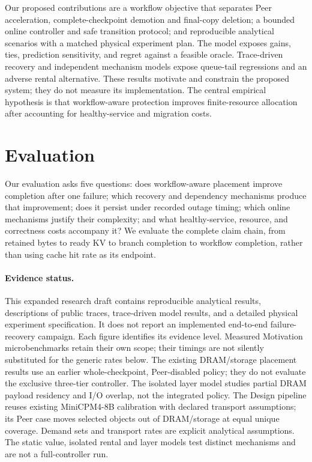 \documentclass[sigplan,10pt,anonymous,nonacm]{acmart}
\begin{document}
Our proposed contributions are a workflow objective that separates Peer
acceleration, complete-checkpoint demotion and final-copy deletion; a bounded online controller and safe transition
protocol; and reproducible analytical scenarios with a matched physical
experiment plan. The model exposes gains, ties, prediction sensitivity,
and regret against a feasible oracle. Trace-driven recovery and independent
mechanism models expose queue-tail regressions and an adverse rental
alternative. These results
motivate and constrain the proposed
system; they do not measure its implementation. The central empirical
hypothesis is that workflow-aware protection improves finite-resource
allocation after accounting for healthy-service and migration costs.





\section{Evaluation}
\label{sec:evaluation}

Our evaluation asks five questions: does workflow-aware placement improve
completion after one failure; which recovery and dependency mechanisms
produce that improvement; does it persist under recorded outage timing;
which online mechanisms justify their complexity; and what healthy-service,
resource, and correctness costs accompany it? We evaluate the complete
claim chain, from retained bytes to ready KV to branch completion to
workflow completion, rather than using cache hit rate as its endpoint.

\paragraph{Evidence status.}
This expanded research draft contains reproducible analytical results,
descriptions of public traces, trace-driven model results, and a detailed
physical experiment specification. It does not report an implemented
end-to-end failure-recovery campaign. Each figure identifies its evidence
level. Measured Motivation microbenchmarks retain their own scope;
their timings are not silently substituted for the generic rates below.
The existing DRAM/storage placement results use an earlier whole-checkpoint,
Peer-disabled policy; they do not evaluate the exclusive three-tier
controller. The isolated layer model studies partial DRAM payload
residency and I/O overlap, not the integrated policy. The Design pipeline
reuses existing MiniCPM4-8B calibration with declared transport assumptions;
its Peer case moves selected objects out of DRAM/storage at equal unique
coverage. Demand sets and transport rates are explicit analytical assumptions.
The static value, isolated rental and layer models test distinct mechanisms
and are not a full-controller run.
\end{document}
